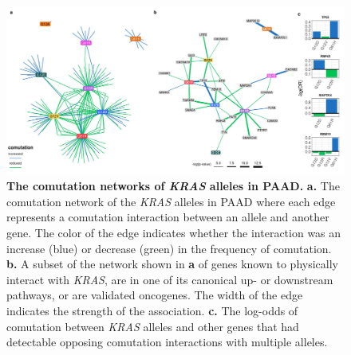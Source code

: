 \documentclass[english, 10pt, letterpaper]{article}
\newcommand{\KRAS}{\emph{KRAS}}
\begin{document}
\begin{figure}[h!]
\centering
\includegraphics[width=180mm]{figures/Supp_Fig_5.jpeg}
\caption{
    \textbf{The comutation networks of \KRAS{} alleles in PAAD.}
    \textbf{a.} The comutation network of the \KRAS{} alleles in PAAD where each edge represents a comutation interaction between an allele and another gene. The color of the edge indicates whether the interaction was an increase (blue) or decrease (green) in the frequency of comutation.
    \textbf{b.} A subset of the network shown in \textbf{a} of genes known to physically interact with \KRAS{}, are in one of its canonical up- or downstream pathways, or are validated oncogenes. The width of the edge indicates the strength of the association.
    \textbf{c.} The log-odds of comutation between \KRAS{} alleles and other genes that had detectable opposing comutation interactions with multiple alleles.
}
\label{sfig:paad-comutation-network}
\end{figure}
\newpage
\end{document}
